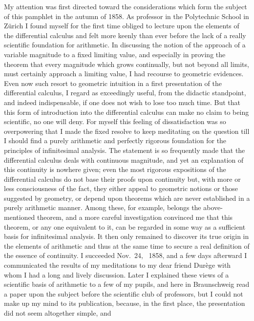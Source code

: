 \documentclass[oneside]{book}
\begin{document}
My attention was first directed toward the considerations
which form the subject of this pamphlet
in the autumn of 1858. As professor in the
Polytechnic School in Zürich I found myself for the
first time obliged to lecture upon the elements of the
differential calculus and felt more keenly than ever
before the lack of a really scientific foundation for
arithmetic. In discussing the notion of the approach
of a variable magnitude to a fixed limiting value, and
especially in proving the theorem that every magnitude
which grows continually, but not beyond all limits,
must certainly approach a limiting value, I had recourse
to geometric evidences. Even now such resort
to geometric intuition in a first presentation of the
differential calculus, I regard as exceedingly useful,
from the didactic standpoint, and indeed indispensable,
if one does not wish to lose too much time. But
that this form of introduction into the differential calculus
can make no claim to being scientific, no one
will deny. For myself this feeling of dissatisfaction
was so overpowering that I made the fixed resolve to
keep meditating on the question till I should find a
purely arithmetic and perfectly rigorous foundation
for the principles of infinitesimal analysis. The statement
is so frequently made that the differential calculus
deals with continuous magnitude, and yet an
explanation of this continuity is nowhere given; even
the most rigorous expositions of the differential calculus
do not base their proofs upon continuity but,
with more or less consciousness of the fact, they
either appeal to geometric notions or those suggested
by geometry, or depend upon theorems which are
never established in a purely arithmetic manner.
Among these, for example, belongs the above-mentioned
theorem, and a more careful investigation convinced
me that this theorem, or any one equivalent to
it, can be regarded in some way as a sufficient basis
for infinitesimal analysis. It then only remained to
discover its true origin in the elements of arithmetic
and thus at the same time to secure a real definition
of the essence of continuity. I succeeded Nov.~24,~%
1858, and a few days afterward I communicated the
results of my meditations to my dear friend Durège
with whom I had a long and lively discussion. Later
I explained these views of a scientific basis of arithmetic
to a few of my pupils, and here in Braunschweig
read a paper upon the subject before the scientific
club of professors, but I could not make up
my mind to its publication, because, in the first place,
the presentation did not seem altogether simple, and
\end{document}
